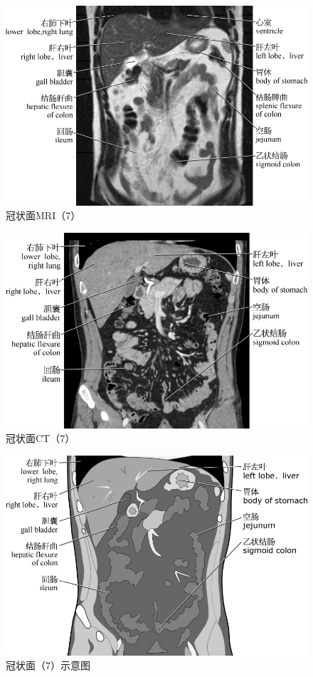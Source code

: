 \begin{figure}[!htbp]
 \centering
 \includegraphics{./images/Image00110.jpg}
 \captionsetup{justification=centering}
 \caption{冠状面MRI（7）}
  \end{figure} 
 \FloatBarrier

\begin{figure}[!htbp]
 \centering
 \includegraphics{./images/Image00111.jpg}
 \captionsetup{justification=centering}
 \caption{冠状面CT（7）}
  \end{figure} 
 \FloatBarrier

\begin{figure}[!htbp]
 \centering
 \includegraphics{./images/Image00112.jpg}
 \captionsetup{justification=centering}
 \caption{冠状面（7）示意图}
  \end{figure} 
 \FloatBarrier

